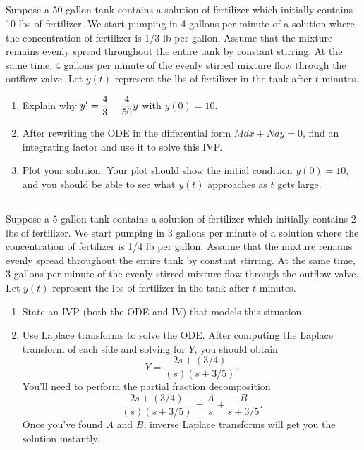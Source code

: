 \subsection*{\ideaB}

\begin{problem}
Suppose a 50 gallon tank contains a solution of fertilizer which initially contains 10 lbs of fertilizer. We start pumping in 4 gallons per minute of a solution where the concentration of fertilizer is 1/3 lb per gallon. 
Assume that the mixture remains evenly spread throughout the entire tank by constant stirring. 
At the same time, 4 gallons per minute of the evenly stirred mixture flow through the outflow valve. 
Let $y(t)$ represent the lbs of fertilizer in the tank after $t$ minutes.
\begin{enumerate}
 \item Explain why $\displaystyle y' = \frac{4}{3}-\frac{4}{50}y$ with $y(0)=10$. 
 \item After rewriting the ODE in the differential form $Mdx+Ndy=0$, find an integrating factor and use it to solve this IVP.
 \item Plot your solution. Your plot should show the initial condition $y(0)=10$, and you should be able to see what $y(t)$ approaches as $t$ gets large.
\end{enumerate}
\end{problem}



\subsection*{\ideaC}
\begin{problem}
Suppose a $5$ gallon tank contains a solution of fertilizer which initially contains $2$ lbs of fertilizer. We start pumping in $3$ gallons per minute of a solution where the concentration of fertilizer is 1/4 lb per gallon. 
Assume that the mixture remains evenly spread throughout the entire tank by constant stirring. 
At the same time, 3 gallons per minute of the evenly stirred mixture flow through the outflow valve. 
Let $y(t)$ represent the lbs of fertilizer in the tank after $t$ minutes.
\begin{enumerate}
 \item 
State an IVP (both the ODE and IV) that models this situation.  
 \item Use Laplace transforms to solve the ODE. After computing the Laplace transform of each side and solving for $Y$, you should obtain 
$$Y= \frac{2s+(3/4)}{(s)(s+3/5)}.$$ You'll need to perform the partial fraction decomposition
%
$$\frac{2s+(3/4)}{(s)(s+3/5)} = \frac{A}{s}+\frac{B}{s+3/5}.$$ Once you've found $A$ and $B$, inverse Laplace transforms will get you the solution instantly.
\end{enumerate}
\end{problem}


